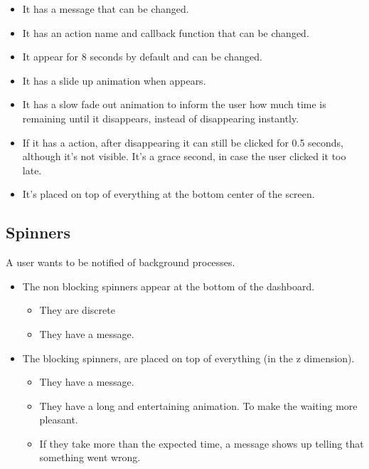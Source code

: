 \begin{itemize}[leftmargin=2cm]
    \item[\nextTask{}\label{req:x}] It has a message that can be changed.
    \item[\nextTask{}\label{req:x}] It has an action name and callback function that can be changed.
    \item[\nextTask{}\label{req:x}] It appear for 8 seconds by default and can be changed.
    \item[\nextTask{}\label{req:x}] It has a slide up animation when appears.
    \item[\nextTask{}\label{req:x}] It has a slow fade out animation to inform the user how much time is remaining until it disappears, instead of disappearing instantly.
    \item[\nextTask{}\label{req:x}] If it has a action, after disappearing it can still be clicked for 0.5 seconds, although it's not visible. It's a grace second, in case the user clicked it too late.
    \item[\nextTask{}\label{req:x}] It's placed on top of everything at the bottom center of the screen.
\end{itemize}

\subsection*{Spinners}
A user wants to be notified of background processes.

\begin{itemize}[leftmargin=2cm]
    \item[\nextTask{}\label{req:x}] The non blocking spinners appear at the bottom of the dashboard.
    \begin{itemize}[leftmargin=2cm]
        \item[\nextTask{}\label{req:x}] They are discrete
        \item[\nextTask{}\label{req:x}] They have a message.
    \end{itemize}
    \item[\nextTask{}\label{req:x}] The blocking spinners, are placed on top of everything (in the z dimension).
    \begin{itemize}[leftmargin=2cm]
        \item[\nextTask{}\label{req:x}] They have a message.
        \item[\nextTask{}\label{req:x}] They have a long and entertaining animation. To make the waiting more pleasant.
        \item[\nextTask{}\label{req:x}] If they take more than the expected time, a message shows up telling that something went wrong.
    \end{itemize}
\end{itemize}

